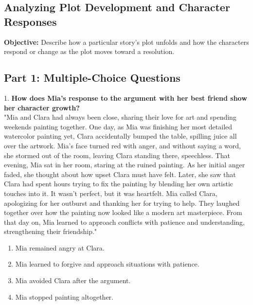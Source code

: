 \documentclass[12pt]{article}
\begin{document}
\subsection*{Analyzing Plot Development and Character Responses}
\onehalfspacing

\begin{tcolorbox}[colframe=black!40, colback=gray!0, title=Learning Objective]
\textbf{Objective:} Describe how a particular story’s plot unfolds and how the characters respond or change as the plot moves toward a resolution.
\end{tcolorbox}

\subsection*{Part 1: Multiple-Choice Questions}

1. \textbf{How does Mia’s response to the argument with her best friend show her character growth?\\}
"Mia and Clara had always been close, sharing their love for art and spending weekends painting together. One day, as Mia was finishing her most detailed watercolor painting yet, Clara accidentally bumped the table, spilling juice all over the artwork. Mia’s face turned red with anger, and without saying a word, she stormed out of the room, leaving Clara standing there, speechless. That evening, Mia sat in her room, staring at the ruined painting. As her initial anger faded, she thought about how upset Clara must have felt. Later, she saw that Clara had spent hours trying to fix the painting by blending her own artistic touches into it. It wasn’t perfect, but it was heartfelt. Mia called Clara, apologizing for her outburst and thanking her for trying to help. They laughed together over how the painting now looked like a modern art masterpiece. From that day on, Mia learned to approach conflicts with patience and understanding, strengthening their friendship."  
\begin{enumerate}[label=\Alph*.]
    \item Mia remained angry at Clara.  
    \item Mia learned to forgive and approach situations with patience.  
    \item Mia avoided Clara after the argument.  
    \item Mia stopped painting altogether.  
\end{enumerate}
\end{document}
